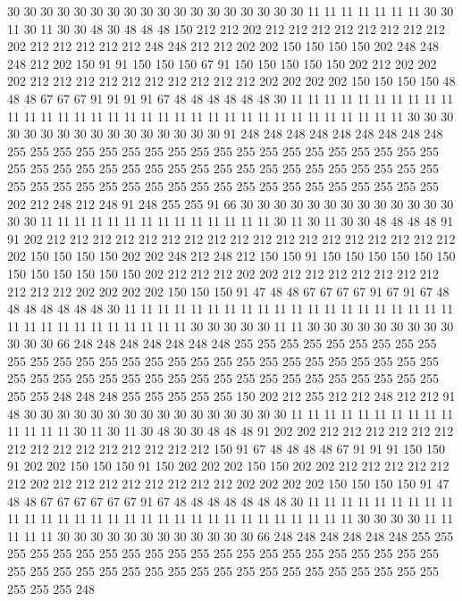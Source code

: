 30 30 30 30 30 30 30 30 30 30 30 30 30 30 30 30 30 30 11 11
11 11 11 11 11 30 30 11 30 11 30 30 48 30 48 48 48 150 212 212
202 212 212 212 212 212 212 212 212 202 212 212 212 212 212 248 248 212 212 202
202 150 150 150 150 202 248 248 248 212 202 150 91 91 150 150 150 67 91 150
150 150 150 150 202 212 202 202 202 212 212 212 212 212 212 212 212 212 212 202
202 202 202 150 150 150 150 48 48 48 67 67 67 91 91 91 91 67 48 48
48 48 48 48 30 11 11 11 11 11 11 11 11 11 11 11 11 11 11 11
11 11 11 11 11 11 11 11 11 11 11 11 11 11 11 11 11 11 11 30
30 30 30 30 30 30 30 30 30 30 30 30 30 30 30 91 248 248 248 248
248 248 248 248 248 255 255 255 255 255 255 255 255 255 255 255 255 255 255 255
255 255 255 255 255 255 255 255 255 255 255 255 255 255 255 255 255 255 255 255
255 255 255 255 255 255 255 255 255 255 255 255 255 255 255 255 255 255 255 255
255 255 202 212 248 212 248 91 248 255 255 91 66 30 30 30 30 30 30 30
30 30 30 30 30 30 30 30 11 11 11 11 11 11 11 11 11 11 11 11
11 11 30 11 30 11 30 30 48 48 48 48 91 91 202 212 212 212 212 212
212 212 212 212 212 212 212 212 212 212 212 212 212 202 150 150 150 150 202 202
248 212 248 212 150 150 91 150 150 150 150 150 150 150 150 150 150 150 150 202
212 212 212 202 202 212 212 212 212 212 212 212 212 212 212 202 202 202 202 150
150 150 91 47 48 48 67 67 67 67 91 67 91 67 48 48 48 48 48 48
48 30 11 11 11 11 11 11 11 11 11 11 11 11 11 11 11 11 11 11
11 11 11 11 11 11 11 11 11 11 11 11 11 30 30 30 30 30 11 11
30 30 30 30 30 30 30 30 30 30 30 30 66 248 248 248 248 248 248 248
255 255 255 255 255 255 255 255 255 255 255 255 255 255 255 255 255 255 255 255
255 255 255 255 255 255 255 255 255 255 255 255 255 255 255 255 255 255 255 255
255 255 255 255 255 255 255 255 255 248 248 248 255 255 255 255 255 150 202 212
255 212 212 248 212 212 91 48 30 30 30 30 30 30 30 30 30 30 30 30
30 30 30 30 11 11 11 11 11 11 11 11 11 11 11 11 11 11 30 11
30 11 30 48 30 30 48 48 48 91 202 202 212 212 212 212 212 212 212 212
212 212 212 212 212 212 212 150 91 67 48 48 48 48 67 91 91 91 150 150
91 202 202 150 150 150 91 150 202 202 202 150 150 202 202 212 212 212 212 212
212 202 212 212 212 212 212 212 212 212 202 202 202 202 150 150 150 150 91 47
48 48 67 67 67 67 67 67 91 67 48 48 48 48 48 48 48 30 11 11
11 11 11 11 11 11 11 11 11 11 11 11 11 11 11 11 11 11 11 11
11 11 11 11 11 11 11 11 30 30 30 30 11 11 11 11 11 30 30 30
30 30 30 30 30 30 30 30 30 66 248 248 248 248 248 248 255 255 255 255
255 255 255 255 255 255 255 255 255 255 255 255 255 255 255 255 255 255 255 255
255 255 255 255 255 255 255 255 255 255 255 255 255 255 255 255 255 255 255 248
